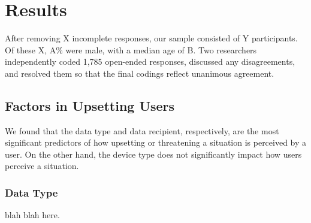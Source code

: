 \documentclass{acm_proc_article-sp}
\begin{document}

\section{Results}
After removing X incomplete responses, our sample consisted of Y participants. Of these X, A\% were male, with a median age of B. Two researchers independently coded 1,785 open-ended responses, discussed any disagreements, and resolved them so that the final codings reflect unanimous agreement. 

\subsection{Factors in Upsetting Users}
We found that the data type and data recipient, respectively, are the most significant predictors of how upsetting or threatening a situation is perceived by a user. On the other hand, the device type does not significantly impact how users perceive a situation.

\subsubsection{Data Type}
blah blah here. 
\end{document}
